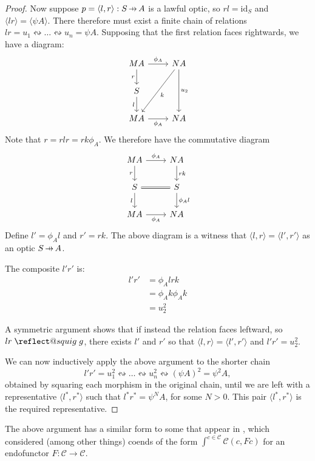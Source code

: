 \documentclass[11pt,a4paper]{article}
\makeatletter
\theoremstyle{plain}
\theoremstyle{definition}
\newcommand{\C}{\mathscr{C}}
\newcommand{\id}{\mathrm{id}}
\newcommand{\hto}{\ensuremath{\,\mathaccent\shortmid\rightarrow\,}}
\providecommand{\leftsquigarrow}{%
  \mathrel{\mathpalette\reflect@squig\relax}%
}
\newcommand{\reflect@squig}[2]{%
  \reflectbox{$\m@th#1\rightsquigarrow$}%
}
\makeatother
\begin{document}
\begin{proof}
  Now suppose $p = \langle l, r \rangle : S \hto A$ is a lawful optic, so $rl = \id_S$ and $\langle lr \rangle = \langle \psi A\rangle$. There therefore must exist a finite chain of relations $lr = u_1 \leftrightsquigarrow \dots \leftrightsquigarrow u_n = \psi A$.
  Supposing that the first relation faces rightwards, we have a diagram:
  \[
    \begin{tikzcd}
      M A \ar[r, "\phi_A"] \ar[d, "r", swap] & N A \ar[dd, "u_2"] \ar[ddl, "k"] \\
      S \ar[d,"l",swap] & \\
      M A \ar[r, "\phi_A", swap] & N A
    \end{tikzcd}
  \]
  Note that $r = rlr = rk\phi_A$. We therefore have the commutative diagram
  \[
    \begin{tikzcd}
      M A \ar[r, "\phi_A"] \ar[d, "r", swap] & N A \ar[d, "rk"] \\
      S \ar[r, equal] \ar[d, "l", swap] & S \ar[d, "\phi_Al"] \\
      MA \ar[r, "\phi_A", swap] & N A
    \end{tikzcd}
  \]
  Define $l' = \phi_A l$ and $r' = rk$. The above diagram is a witness that $\langle l, r \rangle = \langle l', r' \rangle$ as an optic $S \hto A$.

  The composite $l'r'$ is:
  \begin{align*}
    l'r' &= \phi_A l r k \\
         &= \phi_A k \phi_A k \\
         &= u_2^2
  \end{align*}

  A symmetric argument shows that if instead the relation faces leftward, so $lr \leftsquigarrow g$, there exists $l'$ and $r'$ so that $\langle l, r \rangle = \langle l', r' \rangle$ and $l'r' = u_2^2$.

  We can now inductively apply the above argument to the shorter chain \[l'r' = u_1^2 \leftrightsquigarrow \dots \leftrightsquigarrow u_n^2 \leftrightsquigarrow (\psi A)^2 = \psi^2 A,\] obtained by squaring each morphism in the original chain, until we are left with a representative $\langle l^*, r^* \rangle$ such that $l^*r^* = \psi^N A$, for some $N>0$. This pair $\langle l^*, r^* \rangle$ is the required representative.
\end{proof}

The above argument has a similar form to some that appear in \cite{OnTheTrace}, which considered (among other things) coends of the form $\int^{c \in \C} \C(c, Fc)$ for an endofunctor $F : \C \to \C$.
\end{document}
